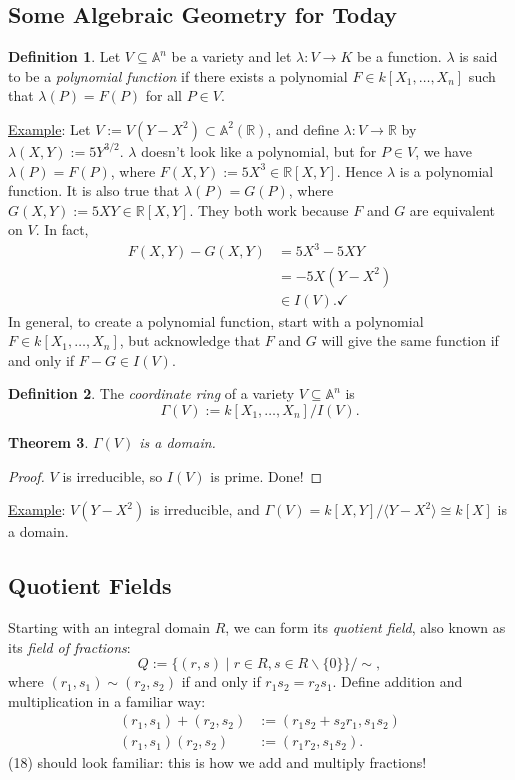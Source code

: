\documentclass[12pt]{article}
\newcommand{\real}{\mathbb{R}}
\newcommand{\ita}[1]{\textit{#1}}
\newcommand{\vbrack}[1]{\langle #1\rangle}
\newtheorem{theorem}{Theorem}[section]
\theoremstyle{definition}
\newtheorem{definition}[theorem]{Definition}
\begin{document}
\subsection{Some Algebraic Geometry for Today}
\begin{definition}
    Let $V\subseteq\mathbb{A}^n$ be a variety and let $\lambda:V\to K$ be a function. $\lambda$ is said to be a \ita{polynomial function} if there exists a polynomial $F\in k[X_1,\dotsc,X_n]$ such that $\lambda(P)=F(P)$ for all $P\in V$.
\end{definition}
\underline{Example}: Let $V:=V(Y-X^2)\subset\mathbb{A}^2(\real)$, and define $\lambda:V\to\real$ by $\lambda(X,Y):=5Y^{3/2}$. $\lambda$ doesn't look like a polynomial, but for $P\in V$, we have $\lambda(P)=F(P)$, where $F(X,Y):=5X^3\in\real[X,Y]$. Hence $\lambda$ is a polynomial function. It is also true that $\lambda(P)=G(P)$, where $G(X,Y):=5XY\in\real[X,Y]$. They both work because $F$ and $G$ are equivalent on $V$. In fact,
\begin{align*}
    F(X,Y)-G(X,Y)&=5X^3-5XY\\
    &=-5X(Y-X^2)\\
    &\in I(V). \checkmark
\end{align*}
In general, to create a polynomial function, start with a polynomial $F\in k[X_1,\dotsc,X_n]$, but acknowledge that $F$ and $G$ will give the same function if and only if $F-G\in I(V)$.
\begin{definition}
    The \ita{coordinate ring} of a variety $V\subseteq\mathbb{A}^n$ is 
    \begin{equation}
        \Gamma(V):=k[X_1,\dotsc,X_n]/I(V).
    \end{equation}
\end{definition}
\begin{theorem}
    $\Gamma(V)$ is a domain.
\end{theorem}
\begin{proof}
    $V$ is irreducible, so $I(V)$ is prime. Done!
\end{proof}
\underline{Example}: $V(Y-X^2)$ is irreducible, and $\Gamma(V)=k[X,Y]/\vbrack{Y-X^2}\cong k[X]$ is a domain.
\subsection{Quotient Fields}
Starting with an integral domain $R$, we can form its \ita{quotient field}, also known as its \ita{field of fractions}:
\begin{equation}
    Q:=\{(r,s)\mid r\in R,s\in R\backslash\{0\}\}/\sim,
\end{equation}
where $(r_1,s_1)\sim(r_2,s_2)$ if and only if $r_1s_2=r_2s_1$. Define addition and multiplication in a familiar way:
\begin{equation}
    \begin{split}
        (r_1,s_1)+(r_2,s_2)&:=(r_1s_2+s_2r_1,s_1s_2)\\
        (r_1,s_1)(r_2,s_2)&:=(r_1r_2,s_1s_2).
    \end{split}
\end{equation}
(18) should look familiar: this is how we add and multiply fractions!
\end{document}
